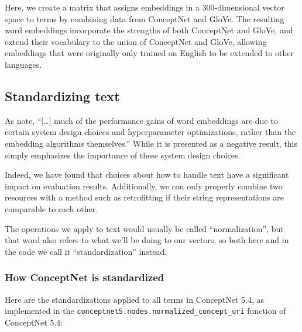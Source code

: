 \documentclass[letterpaper]{article}
\begin{document}
Here, we create a matrix that assigns embeddings in a 300-dimensional vector
space to terms by combining data from ConceptNet and GloVe. The resulting word
embeddings incorporate the strengths of both ConceptNet and GloVe, and extend
their vocabulary to the union of ConceptNet and GloVe, allowing embeddings that
were originally only trained on English to be extended to other languages.


\subsection{Standardizing text}

As \citeauthor{levy2015embeddings}  note,
``[\ldots] much of the performance gains of word embeddings are due to certain
system design choices and hyperparameter optimizations, rather than the
embedding algorithms themselves.'' While it is presented as a negative result,
this simply emphasizes the importance of these system design choices.

Indeed, we have found that choices about how to handle text have a significant
impact on evaluation results. Additionally, we can only properly combine two
resources with a method such as retrofitting if their string representations
are comparable to each other.

The operations we apply to text would usually be called ``normalization'',
but that word also refers to what we'll be doing to our vectors, so both
here and in the code we call it ``standardization'' instead.

\subsubsection{How ConceptNet is standardized}

Here are the standardizations applied to all terms in ConceptNet 5.4, as
implemented in the {\tt conceptnet5.nodes.normalized\_concept\_uri} function
of ConceptNet 5.4:
\end{document}
